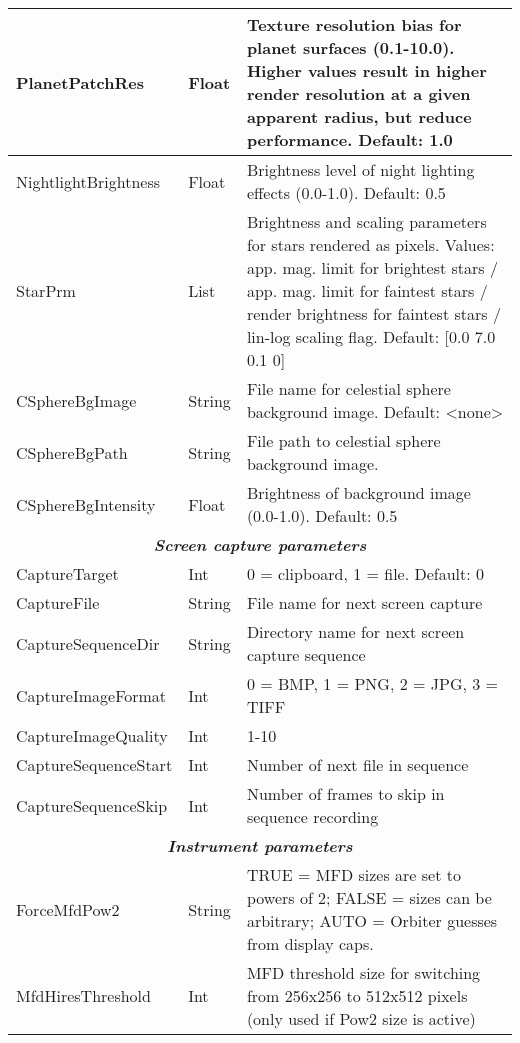 \documentclass[Orbiter Developer Manual.tex]{subfiles}
\begin{document}
\begin{longtable}{ |p{}|p{}|p{}| }
	\hline\rule{0pt}{2ex}
	PlanetPatchRes & Float & Texture resolution bias for planet surfaces (0.1-10.0). Higher values result in higher render resolution at a given apparent radius, but reduce performance. Default: 1.0\\
	\hline\rule{0pt}{2ex}
	NightlightBrightness & Float & Brightness level of night lighting effects (0.0-1.0). Default: 0.5\\
	\hline\rule{0pt}{2ex}
	StarPrm & List & Brightness and scaling parameters for stars rendered as pixels. Values: app. mag. limit for brightest stars / app. mag. limit for faintest stars / render brightness for faintest stars / lin-log scaling flag. Default: [0.0 7.0 0.1 0]\\
	\hline\rule{0pt}{2ex}
	CSphereBgImage & String & File name for celestial sphere background image. Default: <none>\\
	\hline\rule{0pt}{2ex}
	CSphereBgPath & String & File path to celestial sphere background image.\\
	\hline\rule{0pt}{2ex}
	CSphereBgIntensity & Float & Brightness of background image (0.0-1.0). Default: 0.5\\
	\hline
	\multicolumn{3}{|c|}{\rule{0pt}{2ex}\textbf{\textit{Screen capture parameters}}}\\
	\hline\rule{0pt}{2ex}
	CaptureTarget & Int & 0 = clipboard, 1 = file. Default: 0\\
	\hline\rule{0pt}{2ex}
	CaptureFile & String & File name for next screen capture\\
	\hline\rule{0pt}{2ex}
	CaptureSequenceDir & String & Directory name for next screen capture sequence\\
	\hline\rule{0pt}{2ex}
	CaptureImageFormat & Int & 0 = BMP, 1 = PNG, 2 = JPG, 3 = TIFF\\
	\hline\rule{0pt}{2ex}
	CaptureImageQuality & Int & 1-10\\
	\hline\rule{0pt}{2ex}
	CaptureSequenceStart & Int & Number of next file in sequence\\
	\hline\rule{0pt}{2ex}
	CaptureSequenceSkip & Int & Number of frames to skip in sequence recording\\
	\hline
	\multicolumn{3}{|c|}{\rule{0pt}{2ex}\textbf{\textit{Instrument parameters}}}\\
	\hline\rule{0pt}{2ex}
	ForceMfdPow2 & String & TRUE = MFD sizes are set to powers of 2; FALSE = sizes can be arbitrary; AUTO = Orbiter guesses from display caps.\\
	\hline\rule{0pt}{2ex}
	MfdHiresThreshold & Int & MFD threshold size for switching from 256x256 to 512x512 pixels (only used if Pow2 size is active)\\

\end{longtable}
\end{document}
